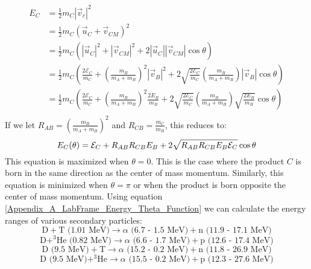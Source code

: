 	\begin{equation}
		\begin{split}
			E_C &= \frac{1}{2} m_C |\vec{v}_c|^2 \\
			& = \frac{1}{2} m_C \left(\vec{u}_C + \vec{v}_{CM}\right)^2 \\
			& = \frac{1}{2} m_C \left( |\vec{u}_C|^2 + |\vec{v}_{CM}|^2 + 2|\vec{u}_C||\vec{v}_{CM}|\cos\theta\right) \\ 
			& = \frac{1}{2} m_C \left( \frac{2\mathcal{E}_C}{m_C} + \left(\frac{m_B}{m_A+m_B}\right)^2|\vec{v}_{B}|^2 + 2\sqrt{\frac{2\mathcal{E}_C}{m_C}}\left(\frac{m_B}{m_A+m_B}\right)|\vec{v}_{B}|\cos\theta\right) \\ 
			& = \frac{1}{2} m_C \left( \frac{2\mathcal{E}_C}{m_C} + \left(\frac{m_B}{m_A+m_B}\right)^2\frac{2E_B}{m_B} + 2\sqrt{\frac{2\mathcal{E}_C}{m_C}}\left(\frac{m_B}{m_A+m_B}\right)\sqrt{\frac{2E_B}{m_B}}\cos\theta\right) \\ 
		\end{split}
	\end{equation}
	If we let $R_{AB} = \left(\frac{m_B}{m_A+m_B}\right)^2$ and $R_{CB}=\frac{m_C}{m_B}$, this reduces to:
	\begin{equation}
		E_C(\theta) = \mathcal{E}_C + R_{AB}R_{CB}E_B + 2 \sqrt{R_{AB}R_{CB}E_B\mathcal{E}_C}\cos\theta \\ 
		\label{Appendix_A_LabFrame_Energy_Theta_Function}
	\end{equation}
	This equation is maximized when $\theta=0$. This is the case where the product $C$ is born in the same direction as the center of mass momentum. Similarly, this equation is minimized when $\theta=\pi$ or when the product is born opposite the center of mass momentum. Using equation \ref{Appendix_A_LabFrame_Energy_Theta_Function} we can calculate the energy ranges of various secondary particles:
	\begin{equation}
		\text{D} + \text{T (1.01 MeV)} \rightarrow \alpha \text{ (6.7 - 1.5 MeV)} + \text{n (11.9 - 17.1 MeV)}
	\end{equation}
	\begin{equation}
		\text{D} + ^3\text{He (0.82 MeV)} \rightarrow \alpha \text{ (6.6 - 1.7 MeV)} + \text{p (12.6 - 17.4 MeV)}
	\end{equation}
	\begin{equation}
		\text{D (9.5 MeV)} + \text{T} \rightarrow \alpha \text{ (15.2 - 0.2 MeV)} + \text{n (11.8 - 26.9 MeV)}
	\end{equation}
	\begin{equation}
		\text{D (9.5 MeV)} + ^3\text{He} \rightarrow \alpha \text{ (15.5 - 0.2 MeV)} + \text{p (12.3 - 27.6 MeV)}
	\end{equation}
